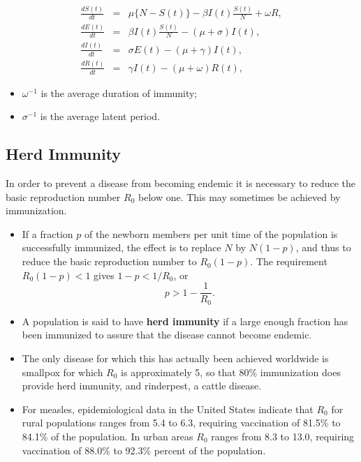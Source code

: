 \documentclass[]{book}
\providecommand{\tightlist}{%
  \setlength{\itemsep}{0pt}\setlength{\parskip}{0pt}}
\begin{document}
\begin{eqnarray*}
\frac{dS(t)}{dt}& = &\mu\{N - S(t)\} - \beta I(t)\frac{S(t)}{N} + \omega R, \\
\frac{dE(t)}{dt}& = &\beta I(t)\frac{S(t)}{N} - (\mu + \sigma)I(t), \\
\frac{dI(t)}{dt}& = &\sigma E(t) - (\mu + \gamma)I(t), \\
\frac{dR(t)}{dt}& = &\gamma I(t) - (\mu + \omega) R(t), 
\end{eqnarray*}

\begin{itemize}
\tightlist
\item
  \(\omega^{-1}\) is the average duration of immunity;
\item
  \(\sigma^{-1}\) is the average latent period.
\end{itemize}

\subsection{Herd Immunity}\label{herd-immunity}

In order to prevent a disease from becoming endemic it is necessary to
reduce the basic reproduction number \(R_0\) below one. This may
sometimes be achieved by immunization.

\begin{itemize}
\item
  If a fraction \(p\) of the newborn members per unit time of the
  population is successfully immunized, the effect is to replace \(N\)
  by \(N(1 - p)\), and thus to reduce the basic reproduction number to
  \(R_0(1 - p)\). The requirement \(R_0(1 - p) < 1\) gives
  \(1 - p < 1/R_0\), or \[
    p > 1 - \frac{1}{R_0}.
  \]
\item
  A population is said to have \textbf{herd immunity} if a large enough
  fraction has been immunized to assure that the disease cannot become
  endemic.
\item
  The only disease for which this has actually been achieved worldwide
  is smallpox for which \(R_0\) is approximately 5, so that 80\%
  immunization does provide herd immunity, and rinderpest, a cattle
  disease.
\item
  For measles, epidemiological data in the United States indicate that
  \(R_0\) for rural populations ranges from 5.4 to 6.3, requiring
  vaccination of 81.5\% to 84.1\% of the population. In urban areas
  \(R_0\) ranges from 8.3 to 13.0, requiring vaccination of 88.0\% to
  92.3\% percent of the population.
\end{itemize}
\end{document}
